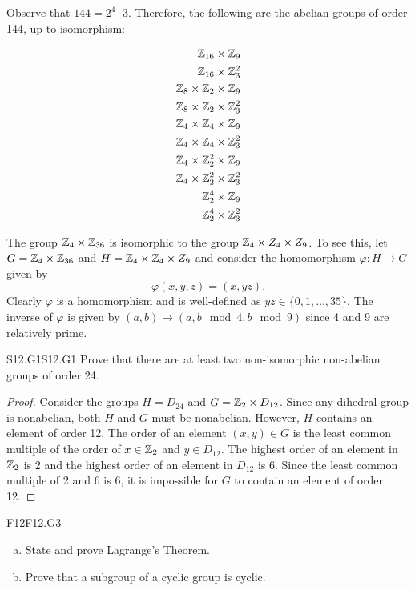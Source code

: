 \documentclass[../AlgebraQualSolutions.tex]{subfiles}
\begin{document}
\begin{solution}
Observe that $144 = 2^4 \cdot 3$. Therefore, the following are the abelian groups of order 144, up to isomorphism:

\begin{align*}
	\mathbb{Z}_{16} \times \mathbb{Z}_9 \\
	\mathbb{Z}_{16} \times \mathbb{Z}_3^2 \\
	\mathbb{Z}_8 \times \mathbb{Z}_2 \times \mathbb{Z}_9 \\
	\mathbb{Z}_8 \times \mathbb{Z}_2 \times \mathbb{Z}_3^2\\
	\mathbb{Z}_4 \times \mathbb{Z}_4 \times \mathbb{Z}_9 \\
	\mathbb{Z}_4 \times \mathbb{Z}_4 \times \mathbb{Z}_3^2\\
	\mathbb{Z}_4 \times \mathbb{Z}_2^2 \times \mathbb{Z}_9 \\
	\mathbb{Z}_4 \times \mathbb{Z}_2^2 \times \mathbb{Z}_3^2 \\
	\mathbb{Z}_2^4 \times \mathbb{Z}_9 \\
	\mathbb{Z}_2^4 \times \mathbb{Z}_3^2 \\
\end{align*}

The group $\mathbb{Z}_4 \times \mathbb{Z}_{36}$ is isomorphic to the group $\mathbb{Z}_4 \times Z_4 \times Z_9$. To see this, let $G = \mathbb{Z}_4 \times \mathbb{Z}_{36}$ and $H = \mathbb{Z}_4 \times \mathbb{Z}_{4} \times Z_9$ and consider the homomorphism $\varphi: H \to G$ given by
	\[\varphi(x,y,z) = (x,yz). \]
Clearly $\varphi$ is a homomorphism and is well-defined as $yz \in \{0,1, \ldots, 35\}$. The inverse of $\varphi$ is given by $(a,b) \mapsto(a,b\mod{4},b\mod{9})$ since 4 and 9 are relatively prime.
\end{solution}

\begin{prob}{S12.G1}{S12.G1}
	Prove that there are at least two non-isomorphic non-abelian groups of order 24.
\end{prob}

\begin{proof}
	Consider the groups $H = D_{24}$ and $G = \mathbb{Z}_2 \times D_{12}$. Since any dihedral group is nonabelian, both $H$ and $G$ must be nonabelian. However, $H$ contains an element of order 12. The order of an element $(x,y) \in G$ is the least common multiple of the order of $x \in \mathbb{Z}_2$ and $y \in D_{12}$. The highest order of an element in $\mathbb{Z}_2$ is 2 and the highest order of an element in $D_{12}$ is 6. Since the least common multiple of 2 and 6 is 6, it is impossible for $G$ to contain an element of order 12.
\end{proof}

	\begin{prob}{F12}{F12.G3}
	\begin{enumerate}[(a)]
	\item State and prove Lagrange's Theorem.
	\item Prove that a subgroup of a cyclic group is cyclic.
	\end{enumerate}
	\end{prob}
	
\end{document}
